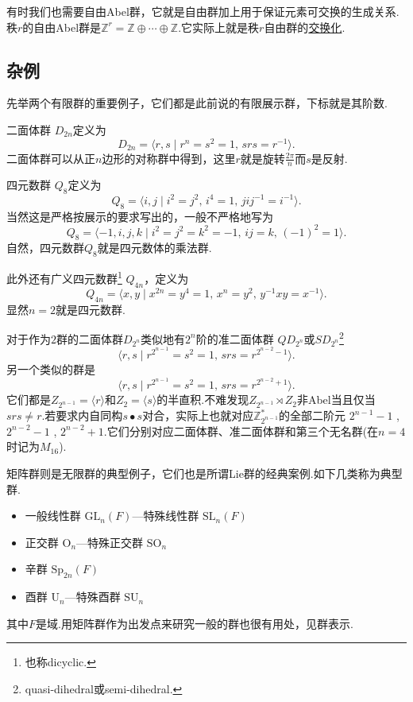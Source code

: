 \begin{remark}
	有时我们也需要{\heiti 自由Abel群}，它就是自由群加上用于保证元素可交换的生成关系.秩$r$的自由Abel群是$\mathbb{Z}^{r}=\mathbb{Z}\oplus\cdots\oplus\mathbb{Z}$.它实际上就是秩$r$自由群的\hyperlink{text:Abelianization}{交换化}.
\end{remark}
\subsection{杂例}
先举两个有限群的重要例子，它们都是此前说的有限展示群，下标就是其阶数.

{\heiti 二面体群} $D_{2n}$定义为
\[
	D_{2n}=\langle r,s\mid r^n=s^2=1,\,srs=r^{-1}\rangle .
\]
二面体群可以从正$n$边形的对称群中得到，这里$r$就是旋转$\frac{2\pi}{n}$而$s$是反射.

{\heiti 四元数群} $Q_8$定义为
\[
	Q_8=\langle i,j\mid i^2=j^2,\,i^4=1,\,jij^{-1}=i^{-1}\rangle .
\]
当然这是严格按展示的要求写出的，一般不严格地写为
\[
	Q_8=\langle -1,i,j,k\mid i^2=j^2=k^2=-1,\,ij=k,\,(-1)^2=1\rangle .
\]
自然，四元数群$Q_8$就是四元数体的乘法群.
\begin{remark}
	此外还有{\heiti 广义四元数群}\footnote{也称dicyclic.} $Q_{4n}$，定义为
	\[
		Q_{4n}=\langle x,y\mid x^{2n}=y^4=1,\,x^n=y^2,\,y^{-1}xy=x^{-1}\rangle .
	\]
	显然$n=2$就是四元数群.

	对于作为$2$群的二面体群$D_{2^n}$类似地有$2^n$阶的{\heiti 准二面体群} $QD_{2^n}$或$SD_{2^n}$\footnote{quasi-dihedral或semi-dihedral.}
	\[
		\langle r,s\mid r^{2^{n-1}}=s^2=1,\,srs=r^{2^{n-2}-1}\rangle .
	\]
	另一个类似的群是
	\[
		\langle r,s\mid r^{2^{n-1}}=s^2=1,\,srs=r^{2^{n-2}+1}\rangle .
	\]
	它们都是$Z_{2^{n-1}}=\langle r\rangle $和$Z_2=\langle s\rangle $的半直积.不难发现$Z_{2^{n-1}}\rtimes Z_2$非Abel当且仅当$srs\ne r$.若要求内自同构$s\bullet s$对合，实际上也就对应$\mathbb{Z}_{2^{n-1}}^*$的全部二阶元 $2^{n-1}-1$ , $2^{n-2}-1$ , $2^{n-2}+1$.它们分别对应二面体群、准二面体群和第三个无名群(在$n=4$时记为$M_{16}$).
\end{remark}

{\heiti 矩阵群}则是无限群的典型例子，它们也是所谓Lie群的经典案例.如下几类称为{\heiti 典型群}.
\begin{itemize}
	\item {\heiti 一般线性群} $\mathrm{GL}_n(F)$\quad ---{\heiti 特殊线性群} $\mathrm{SL}_n(F)$
	\item {\heiti 正交群} $\mathrm{O}_n$\quad ---{\heiti 特殊正交群} $\mathrm{SO}_n$
	\item {\heiti 辛群} $\mathrm{Sp}_{2n}(F)$
	\item {\heiti 酉群} $\mathrm{U}_n$\quad ---{\heiti 特殊酉群} $\mathrm{SU}_n$
\end{itemize}
其中$F$是域.用矩阵群作为出发点来研究一般的群也很有用处，见群表示.%

